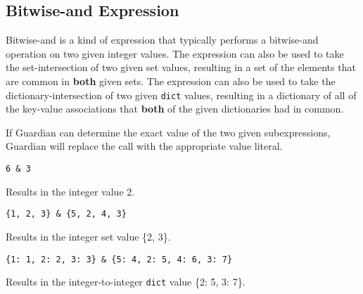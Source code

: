 
\subsection{Bitwise-and Expression}
{
	Bitwise-and is a kind of expression that typically performs
	a bitwise-and operation on two given integer values.
	The expression can also be used to take the set-intersection of two given
	set values, resulting in a set of the elements that are
	common in \textbf{both}
	given sets.
	The expression can also be used to take the
	dictionary-intersection of two given
	\texttt{dict} values, resulting in a dictionary of all of the key-value
	associations that \textbf{both} of the given dictionaries had in common.
	
	If Guardian can determine the exact value of the two given subexpressions,
	Guardian will replace the call with the appropriate value literal.
	
	\begin{itemize}
	{
		\item \texttt{6 \& 3}
		
			Results in the integer value 2.
		
		\item \texttt{\{1, 2, 3\} \& \{5, 2, 4, 3\}}
		
			Results in the integer set value \{2, 3\}.
		
		\item \texttt{\{1: 1, 2: 2, 3: 3\} \& \{5: 4, 2: 5, 4: 6, 3: 7\}}
		
			Results in the integer-to-integer \texttt{dict} value \{2: 5, 3: 7\}.
	}
	\end{itemize}
}
